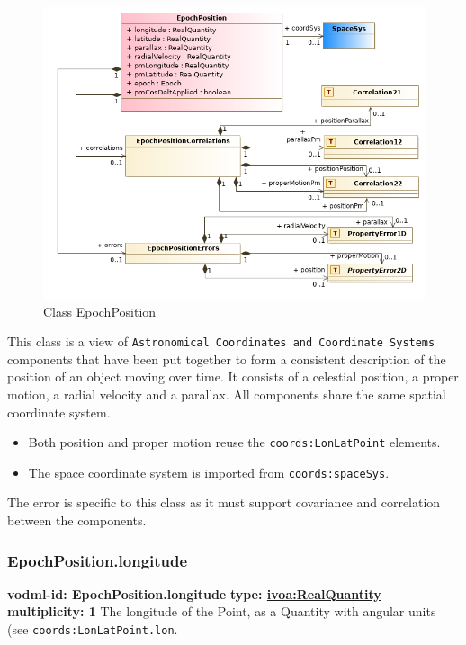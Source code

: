       \begin{figure}[h]
        \includegraphics[width=1.0\textwidth]{../model/EpochPosition.png}
        \caption{Class EpochPosition}
        \label{fig:EpochPosition}
      \end{figure}

    
  \label{sect:EpochPosition}
    This class is a view of \texttt{Astronomical Coordinates and Coordinate Systems} components that have been put together to form a consistent description of the position of an object moving over time. It consists of a celestial position, a proper motion, a radial velocity and a parallax. All components share the same spatial coordinate system. \begin{itemize} \item Both position and proper motion reuse the \texttt{coords:LonLatPoint} elements. \item The space coordinate system is imported from \texttt{coords:spaceSys}. \end{itemize} The error is specific to this class as it must support covariance and correlation between the components.

    \subsubsection{EpochPosition.longitude}
      \textbf{vodml-id: EpochPosition.longitude} \newline
      \textbf{type: \hyperref[sect:ivoa]{ivoa:RealQuantity}} \newline
      \textbf{multiplicity: 1} \newline 
      The longitude of the Point, as a Quantity with angular units (see \texttt{coords:LonLatPoint.lon}.

